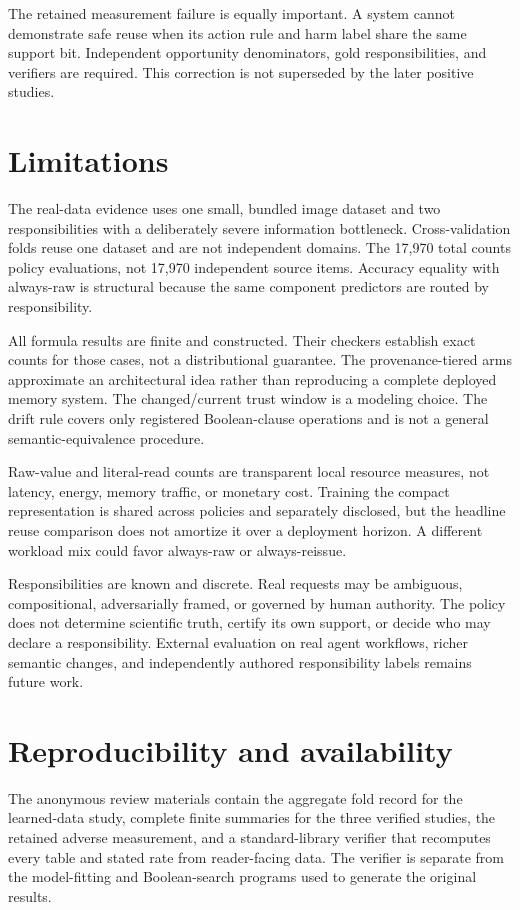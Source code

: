 \documentclass[10pt]{article}
\begin{document}
The retained measurement failure is equally important. A system cannot demonstrate safe reuse when its action rule and harm label share the same support bit. Independent opportunity denominators, gold responsibilities, and verifiers are required. This correction is not superseded by the later positive studies.

\section{Limitations}

The real-data evidence uses one small, bundled image dataset and two responsibilities with a deliberately severe information bottleneck. Cross-validation folds reuse one dataset and are not independent domains. The 17,970 total counts policy evaluations, not 17,970 independent source items. Accuracy equality with always-raw is structural because the same component predictors are routed by responsibility.

All formula results are finite and constructed. Their checkers establish exact counts for those cases, not a distributional guarantee. The provenance-tiered arms approximate an architectural idea rather than reproducing a complete deployed memory system. The changed/current trust window is a modeling choice. The drift rule covers only registered Boolean-clause operations and is not a general semantic-equivalence procedure.

Raw-value and literal-read counts are transparent local resource measures, not latency, energy, memory traffic, or monetary cost. Training the compact representation is shared across policies and separately disclosed, but the headline reuse comparison does not amortize it over a deployment horizon. A different workload mix could favor always-raw or always-reissue.

Responsibilities are known and discrete. Real requests may be ambiguous, compositional, adversarially framed, or governed by human authority. The policy does not determine scientific truth, certify its own support, or decide who may declare a responsibility. External evaluation on real agent workflows, richer semantic changes, and independently authored responsibility labels remains future work.

\section{Reproducibility and availability}

The anonymous review materials contain the aggregate fold record for the learned-data study, complete finite summaries for the three verified studies, the retained adverse measurement, and a standard-library verifier that recomputes every table and stated rate from reader-facing data. The verifier is separate from the model-fitting and Boolean-search programs used to generate the original results.
\end{document}
